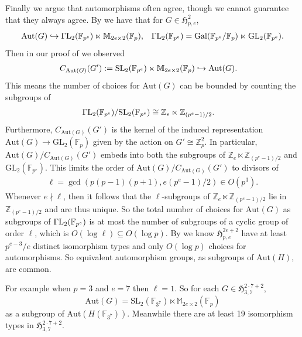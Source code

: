 \documentclass{toc}
\numberwithin{equation}{section}
\theoremstyle{plain}       %
\theoremstyle{remark}
\theoremstyle{definition}
\numberwithin{figure}{section}
\numberwithin{table}{section}
\newcommand{\mygroups}{\mathfrak{H}}
\renewcommand{\subset}{\subseteq}
\newcommand{\bbF}{\mathbb{F}}  %
\begin{document}
Finally we argue that automorphisms often agree, though we cannot guarantee that
they always agree.  By  we have that for $G\in
\mygroups_{p,e}^{2}$,
\begin{align*}
	\mathrm{Aut}(G) &\hookrightarrow 
	\Gamma{\rm L}_2(\bbF_{p^e})\ltimes \mathbb{M}_{2e\times 2}(\bbF_p), 
	& \Gamma{\rm L}_2(\bbF_{p^e})=\mathrm{Gal}(\bbF_{p^e}/\bbF_p)\ltimes 
		\mathrm{GL}_2(\bbF_{p^e}).
\end{align*}
Then in our proof of  we observed
\begin{align*}
	C_{\mathrm{Aut}(G)}(G'):={\rm SL}_2(\bbF_{p^e})\ltimes 
	\mathbb{M}_{2e\times 2}(\bbF_p) &\hookrightarrow
		\mathrm{Aut}(G).
\end{align*}
This means the number of choices for $\mathrm{Aut}(G)$ can be bounded by
counting the subgroups of
\begin{align*}
	\Gamma{\rm L}_2(\bbF_{p^e})/\mathrm{SL}_2(\mathrm{F}_{p^e}) & \cong \mathbb{Z}_e \ltimes \mathbb{Z}_{(p^e-1)/2}.
\end{align*}
Furthermore, $C_{\mathrm{Aut}(G)}(G')$ is the kernel of the induced
representation $\mathrm{Aut}(G)\to \mathrm{GL}_2(\bbF_p)$ given by the action on
$G'\cong \mathbb{Z}_p^2$.  In particular,
$\mathrm{Aut}(G)/C_{\mathrm{Aut}(G)}(G')$ embeds into both the subgroups of
$\mathbb{Z}_e \ltimes \mathbb{Z}_{(p^e-1)/2}$ and $\mathrm{GL}_2(\bbF_{p^e})$.
This limits the order of $\mathrm{Aut}(G)/C_{\mathrm{Aut}(G)}(G')$ to divisors
of 
\begin{align*}
	\ell=\gcd\left(p(p-1)(p+1), e(p^e-1)/2\right)\in O(p^3).
\end{align*}
Whenever $e\nmid \ell$, then it follows that the $\ell$-subgroups of
$\mathbb{Z}_e \ltimes \mathbb{Z}_{(p^e-1)/2}$ lie in $\mathbb{Z}_{(p^e-1)/2}$
and are thus unique.  So the total number of choices for $\mathrm{Aut}(G)$ as
subgroups of $\Gamma{\rm L}_2(\bbF_{p^e})$ is at most the number of subgroups of
a cyclic group of order $\ell$, which is $O(\log \ell)\subset O(\log p)$.  By
 we know $\mygroups_{p,e}^{2e+2}$ have at least
$p^{e-3}/e$ distinct isomorphism types and only $O(\log p)$ choices for
automorphisms.  So equivalent automorphism groups, as subgroups of
$\mathrm{Aut}(H)$, are common.  

For example when $p=3$ and $e=7$ then $\ell=1$.   So for each $G\in
\mygroups_{3,7}^{2\cdot 7+2}$, 
\[
\mathrm{Aut}(G)=\mathrm{SL}_2(\bbF_{3^7})\ltimes
\mathbb{M}_{2e\times 2}(\bbF_p)
\]
as a subgroup of $\mathrm{Aut}(H(\bbF_{3^7}))$.
Meanwhile there are at least 19 isomorphism types in
$\mygroups_{3,7}^{2\cdot 7+2}$.
\end{document}
